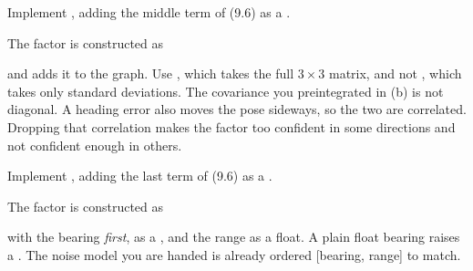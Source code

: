 \begin{parts}
\begin{subparts}
        \subpart Implement , adding the middle term of (9.6) as a .
        \begin{longhint}
            The factor is constructed as
            \begin{center}\end{center}
            and  adds it to the graph. Use , which takes the full \(3\times3\) matrix, and not , which takes only standard deviations. The covariance you preintegrated in (b) is not diagonal. A heading error also moves the pose sideways, so the two are correlated. Dropping that correlation makes the factor too confident in some directions and not confident enough in others.
        \end{longhint}
        \begin{solution}  \end{solution}

        \subpart Implement , adding the last term of (9.6) as a .
        \begin{longhint}
            The factor is constructed as
            \begin{center}\end{center}
            with the bearing \emph{first}, as a , and the range as a float. A plain float bearing raises a . The noise model you are handed is already ordered [bearing, range] to match.
        \end{longhint}
        \begin{solution}  \end{solution}
    \end{subparts}

    \breakans

\end{parts}
